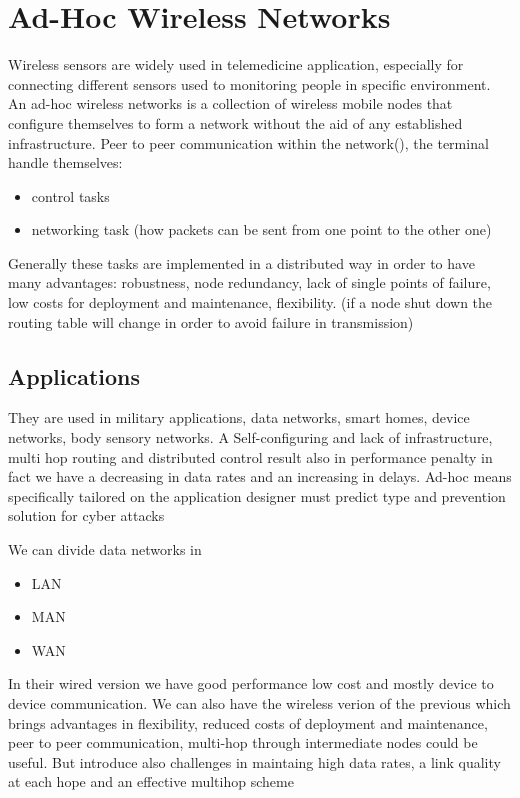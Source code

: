 \chapter{Ad-Hoc Wireless Networks}
Wireless sensors are widely used in telemedicine application, especially for connecting different sensors used to monitoring people in specific environment. An ad-hoc wireless networks is a collection of wireless mobile nodes that configure themselves to form a network without the aid of any established infrastructure.
Peer to peer communication within the network(), the terminal handle themselves:
\begin{itemize}
	\item control tasks
	\item networking task (how packets can be sent from one point to the other one)
\end{itemize}
Generally these tasks are implemented in a distributed way in order to have many advantages: robustness, node redundancy, lack of single points of failure, low costs for deployment and maintenance, flexibility. (if a node shut down the routing table will change in order to avoid failure in transmission)

\section{Applications}
They are used in military applications, data networks, smart homes, device networks, body sensory networks. A Self-configuring and lack of infrastructure, multi hop routing and distributed control result also in performance penalty in fact we have a decreasing in data rates and an increasing in delays.
Ad-hoc means specifically tailored on the application designer must predict type and prevention solution for cyber attacks

We can divide data networks in
\begin{itemize}
\item LAN
\item MAN
\item WAN
\end{itemize}
In their wired version we have good performance low cost and mostly device to device communication. We can also have the wireless verion of the previous which brings advantages in flexibility, reduced costs of deployment and maintenance, peer to peer communication, multi-hop through intermediate nodes could be useful. But introduce also challenges in maintaing high data rates, a link quality at each hope and an effective multihop scheme

